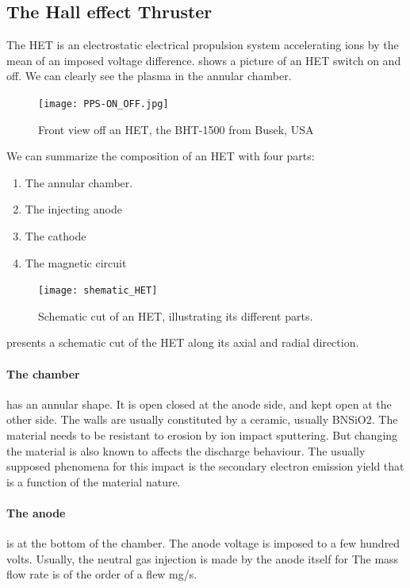

\subsection{The Hall effect Thruster }
\label{sec-HET}

The \ac{HET} is an electrostatic electrical propulsion system accelerating ions by the mean of an imposed voltage difference.
 shows a picture of an \ac{HET} switch on and off.
We can clearly see the plasma in the annular chamber.


\begin{figure}[hbtp]
  \centering
  \texttt{[image: PPS-ON\_OFF.jpg]}
  \caption{Front view off an \ac{HET}, the BHT-1500 from Busek, USA}
  \label{fig-bhtonoff}
\end{figure}

We can summarize the composition of an \ac{HET} with four parts:
\begin{enumerate}
  \item The annular chamber.
  \item The injecting anode
  \item The cathode
  \item The magnetic circuit
\end{enumerate}

\begin{figure}[hbtp]
  \centering
  \texttt{[image: shematic\_HET]}
  \caption{Schematic cut of an \ac{HET}, illustrating its different parts. }
  \label{fig-shematiccut}
\end{figure}

 presents a schematic cut of the \ac{HET} along its axial and radial direction.

\paragraph{The chamber} has an annular shape.
It is open closed at the anode side, and kept open at the other side.
The walls are usually constituted by a ceramic, usually \ac{BNSiO2}.
The material needs to be resistant to erosion by ion impact sputtering.
But changing the material is also known to affects the discharge behaviour.
The usually supposed phenomena for this impact is the secondary electron emission yield that is a function of the material nature.


\paragraph{The anode} is at the bottom of the chamber.
The anode voltage is imposed to a few hundred volts.
Usually, the neutral gas injection is made by the anode itself for
The mass flow rate is of the order of a flew mg/s.


